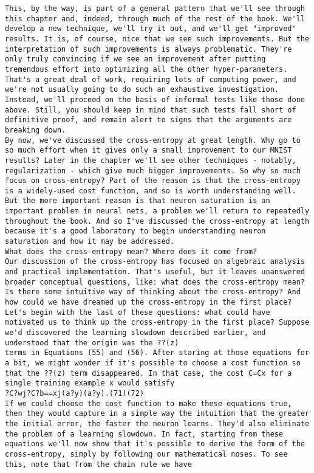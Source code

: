 \begin{lstlisting}
This, by the way, is part of a general pattern that we'll see through this chapter and, indeed, through much of the rest of the book. We'll develop a new technique, we'll try it out, and we'll get "improved" results. It is, of course, nice that we see such improvements. But the interpretation of such improvements is always problematic. They're only truly convincing if we see an improvement after putting tremendous effort into optimizing all the other hyper-parameters. That's a great deal of work, requiring lots of computing power, and we're not usually going to do such an exhaustive investigation. Instead, we'll proceed on the basis of informal tests like those done above. Still, you should keep in mind that such tests fall short of definitive proof, and remain alert to signs that the arguments are breaking down.
By now, we've discussed the cross-entropy at great length. Why go to so much effort when it gives only a small improvement to our MNIST results? Later in the chapter we'll see other techniques - notably, regularization - which give much bigger improvements. So why so much focus on cross-entropy? Part of the reason is that the cross-entropy is a widely-used cost function, and so is worth understanding well. But the more important reason is that neuron saturation is an important problem in neural nets, a problem we'll return to repeatedly throughout the book. And so I've discussed the cross-entropy at length because it's a good laboratory to begin understanding neuron saturation and how it may be addressed.
What does the cross-entropy mean? Where does it come from?
Our discussion of the cross-entropy has focused on algebraic analysis and practical implementation. That's useful, but it leaves unanswered broader conceptual questions, like: what does the cross-entropy mean? Is there some intuitive way of thinking about the cross-entropy? And how could we have dreamed up the cross-entropy in the first place?
Let's begin with the last of these questions: what could have motivated us to think up the cross-entropy in the first place? Suppose we'd discovered the learning slowdown described earlier, and understood that the origin was the ??(z)
terms in Equations (55) and (56). After staring at those equations for a bit, we might wonder if it's possible to choose a cost function so that the ??(z) term disappeared. In that case, the cost C=Cx for a single training example x would satisfy 
?C?wj?C?b==xj(a?y)(a?y).(71)(72)
If we could choose the cost function to make these equations true, then they would capture in a simple way the intuition that the greater the initial error, the faster the neuron learns. They'd also eliminate the problem of a learning slowdown. In fact, starting from these equations we'll now show that it's possible to derive the form of the cross-entropy, simply by following our mathematical noses. To see this, note that from the chain rule we have 

\end{lstlisting}

